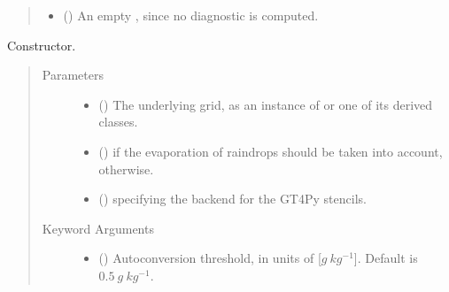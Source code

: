 \documentclass[letterpaper,10pt,english]{sphinxmanual}
\begin{document}
\begin{fulllineitems}
\begin{fulllineitems}
\begin{quote}
\begin{description}
\begin{itemize}
\begin{itemize}
\end{itemize}

\item {} 
 () \textendash{} An empty , since no diagnostic is computed.

\end{itemize}


\end{description}\end{quote}

\end{fulllineitems}


\begin{fulllineitems}
\label{\detokenize{api:parameterizations.slow_tendency_microphysics_kessler_wrf.SlowTendencyMicrophysicsKesslerWRF.__init__}}
Constructor.
\begin{quote}\begin{description}
\item[{Parameters}] \leavevmode\begin{itemize}
\item {} 
 () \textendash{} The underlying grid, as an instance of {\hyperref[\detokenize{api:grids.grid_xyz.GridXYZ}]{}} or one of its derived classes.

\item {} 
 () \textendash{}  if the evaporation of raindrops should be taken into account,  otherwise.

\item {} 
 () \textendash{}  specifying the backend for the GT4Py stencils.

\end{itemize}

\item[{Keyword Arguments}] \leavevmode\begin{itemize}
\item {} 
 () \textendash{} Autoconversion threshold, in units of {[}\(g ~ kg^{-1}\){]}. Default is \(0.5 ~ g ~ kg^{-1}\).


\end{itemize}
\end{description}
\end{quote}
\end{fulllineitems}
\end{fulllineitems}
\end{document}
